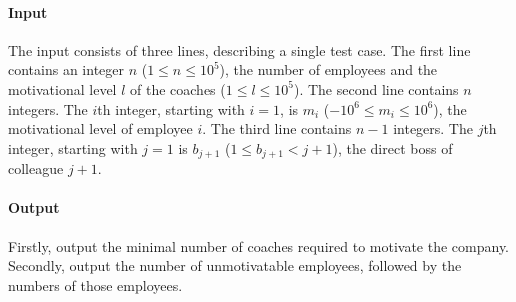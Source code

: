 \paragraph*{Input}

The input consists of three lines, describing a single test case.
The first line contains an integer $n$ ($1 \leq n \leq 10^5$), the number of employees and the motivational level $l$ of the coaches ($1 \leq l \leq 10^5$).
The second line contains $n$ integers. The $i$th integer, starting with $i = 1$, is $m_i$ ($-10^6 \leq m_i \leq 10^6$), the motivational level of employee $i$.
The third line contains $n - 1$ integers. The $j$th integer, starting with $j = 1$ is $b_{j+1}$ ($1 \leq b_{j+1} < j + 1$), the direct boss of colleague $j + 1$.

\paragraph*{Output}

Firstly, output the minimal number of coaches required to motivate the company.
Secondly, output the number of unmotivatable employees, followed by the numbers of those employees.


\begin{samples}
\end{samples}


